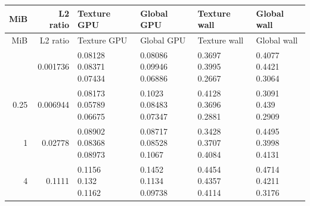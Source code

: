 \begingroup
\scriptsize
\setlength{\tabcolsep}{2.5pt}
\renewcommand{\arraystretch}{1.16}
\begin{longtable}{rrp{2.85cm}p{2.85cm}p{2.85cm}p{2.85cm}}
\toprule
MiB & L2 ratio & Texture GPU & Global GPU & Texture wall & Global wall \\
\midrule\endfirsthead
\toprule
MiB & L2 ratio & Texture GPU & Global GPU & Texture wall & Global wall \\
\midrule\endhead
\bottomrule\endfoot
0.0625 & 0.001736 & \shortstack[r]{0.08128\\0.08371\\0.07434} & \shortstack[r]{0.08086\\0.09946\\0.06886} & \shortstack[r]{0.3697\\0.3995\\0.2667} & \shortstack[r]{0.4077\\0.4421\\0.3064} \\
0.25 & 0.006944 & \shortstack[r]{0.08173\\0.05789\\0.06675} & \shortstack[r]{0.1023\\0.08483\\0.07347} & \shortstack[r]{0.4128\\0.3696\\0.2881} & \shortstack[r]{0.3091\\0.439\\0.2909} \\
1 & 0.02778 & \shortstack[r]{0.08902\\0.08368\\0.08973} & \shortstack[r]{0.08717\\0.08528\\0.1067} & \shortstack[r]{0.3428\\0.3707\\0.4084} & \shortstack[r]{0.4495\\0.3998\\0.4131} \\
4 & 0.1111 & \shortstack[r]{0.1156\\0.132\\0.1162} & \shortstack[r]{0.1452\\0.1134\\0.09738} & \shortstack[r]{0.4454\\0.4357\\0.4114} & \shortstack[r]{0.4714\\0.4211\\0.3176} \\

\end{longtable}
